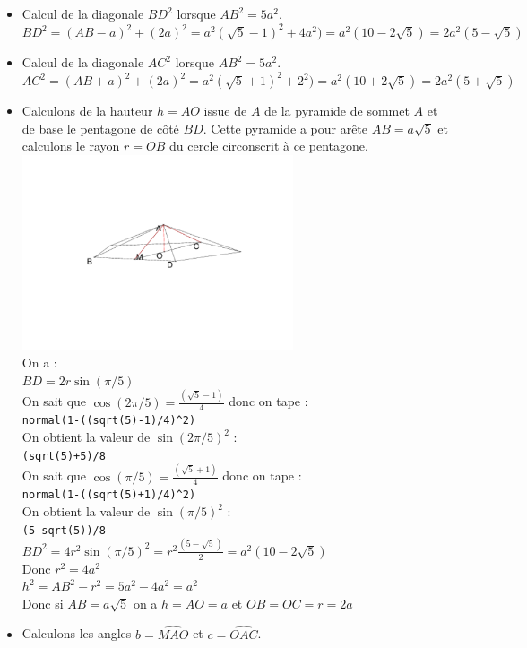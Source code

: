 \documentclass[a4paper,11pt]{book}
\begin{document}
\begin{itemize}
\item Calcul de la diagonale $BD^2$ lorsque $AB^2=5a^2$.\\
$BD^2=(AB-a)^2+(2a)^2=a^2(\sqrt 5-1)^2+4a^2)=a^2(10-2\sqrt 5)=2a^2(5-\sqrt 5)$
 \item Calcul de la diagonale $AC^2$ lorsque $AB^2=5a^2$.\\
$AC^2=(AB+a)^2+(2a)^2=a^2(\sqrt 5+1)^2+2^2)=a^2(10+2\sqrt 5)=2a^2(5+\sqrt 5)$
\item Calculons de la hauteur $h=AO$ issue de $A$ de la pyramide de sommet $A$
et de base le pentagone de c\^ot\'e  $BD$. Cette pyramide a pour ar\^ete 
$AB=a\sqrt 5$ et calculons le rayon $r=OB$ du cercle circonscrit \`a ce 
pentagone.\\
\includegraphics[width=8cm]{triacon1}\\
On a :\\
$BD=2r\sin(\pi/5)$\\
On sait que $\cos(2\pi/5)=\frac{(\sqrt 5-1)}{4}$ donc on tape :\\
{\tt normal(1-((sqrt(5)-1)/4)\verb|^|2)} \\
On obtient la valeur de $\sin(2\pi/5)^2$ :\\
{\tt (sqrt(5)+5)/8}\\
On sait que $\cos(\pi/5)=\frac{(\sqrt 5+1)}{4}$ donc on tape :\\
{\tt normal(1-((sqrt(5)+1)/4)\verb|^|2)} \\
On obtient la valeur de $\sin(\pi/5)^2$ :\\
{\tt (5-sqrt(5))/8}\\
$BD^2=4r^2\sin(\pi/5)^2=r^2\frac{(5-\sqrt 5)}{2}=a^2(10-2\sqrt 5)$\\
Donc $r^2=4a^2$\\
$h^2=AB^2-r^2=5a^2-4a^2=a^2$\\
Donc si $AB=a\sqrt 5$ on a $h=AO=a$ et $OB=OC=r=2a$
\item Calculons les angles $b=\widehat{MAO}$ et $c=\widehat{OAC}$.\\

\end{itemize}
\end{document}
